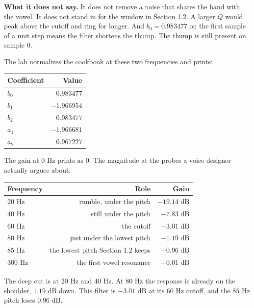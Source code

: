 \documentclass[11pt,a4paper]{article}
\begin{document}
\begin{equationcard}
\textbf{What it does not say.} It does not remove a noise that shares the band with the vowel. It does not stand in for the window in Section 1.2. A larger $Q$ would peak above the cutoff and ring for longer. And $b_0 = 0.983477$ on the first sample of a unit step means the filter shortens the thump. The thump is still present on sample 0.
\end{equationcard}

The lab normalizes the cookbook at these two frequencies and prints:

\begin{center}
\begin{tabular}{lr}
\toprule
Coefficient & Value \\
\midrule
$b_0$ & $0.983477$ \\
$b_1$ & $-1.966954$ \\
$b_2$ & $0.983477$ \\
$a_1$ & $-1.966681$ \\
$a_2$ & $0.967227$ \\
\bottomrule
\end{tabular}
\end{center}

The gain at $0\text{ Hz}$ prints as $0$. The magnitude at the probes a voice designer actually argues about:

\begin{center}
\begin{tabular}{lrr}
\toprule
Frequency & Role & Gain \\
\midrule
$20\text{ Hz}$ & rumble, under the pitch & $-19.14\text{ dB}$ \\
$40\text{ Hz}$ & still under the pitch & $-7.83\text{ dB}$ \\
$60\text{ Hz}$ & the cutoff & $-3.01\text{ dB}$ \\
$80\text{ Hz}$ & just under the lowest pitch & $-1.19\text{ dB}$ \\
$85\text{ Hz}$ & the lowest pitch Section 1.2 keeps & $-0.96\text{ dB}$ \\
$300\text{ Hz}$ & the first vowel resonance & $-0.01\text{ dB}$ \\
\bottomrule
\end{tabular}
\end{center}

The deep cut is at $20\text{ Hz}$ and $40\text{ Hz}$. At $80\text{ Hz}$ the response is already on the shoulder, $1.19\text{ dB}$ down. This filter is $-3.01\text{ dB}$ at its $60\text{ Hz}$ cutoff, and the $85\text{ Hz}$ pitch loses $0.96\text{ dB}$.
\end{document}
